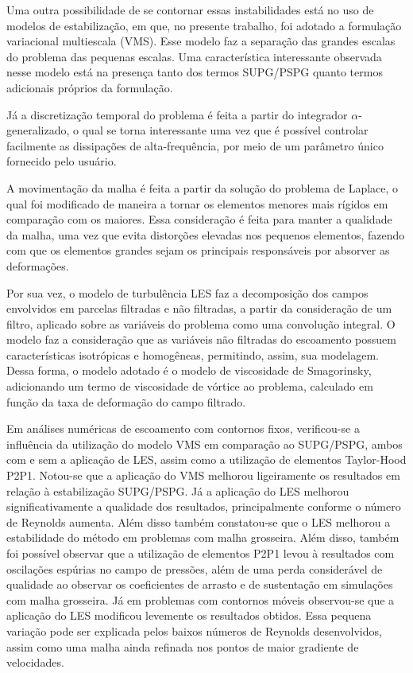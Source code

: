 Uma outra possibilidade de se contornar essas instabilidades está no uso de modelos de estabilização, em que, no presente trabalho, foi adotado a formulação variacional multiescala (VMS). Esse modelo faz a separação das grandes escalas do problema das pequenas escalas. Uma característica interessante observada nesse modelo está na presença tanto dos termos SUPG/PSPG quanto termos adicionais próprios da formulação.

Já a discretização temporal do problema é feita a partir do integrador $\alpha$-generalizado, o qual se torna interessante uma vez que é possível controlar facilmente as dissipações de alta-frequência, por meio de um parâmetro único fornecido pelo usuário.

A movimentação da malha é feita a partir da solução do problema de Laplace, o qual foi modificado de maneira a tornar os elementos menores mais rígidos em comparação com os maiores. Essa consideração é feita para manter a qualidade da malha, uma vez que evita distorções elevadas nos pequenos elementos, fazendo com que os elementos grandes sejam os principais responsáveis por absorver as deformações.

Por sua vez, o modelo de turbulência LES faz a decomposição dos campos envolvidos em parcelas filtradas e não filtradas, a partir da consideração de um filtro, aplicado sobre as variáveis do problema como uma convolução integral. O modelo faz a consideração que as variáveis não filtradas do escoamento possuem características isotrópicas e homogêneas, permitindo, assim, sua modelagem. Dessa forma, o modelo adotado é o modelo de viscosidade de Smagorinsky, adicionando um termo de viscosidade de vórtice ao problema, calculado em função da taxa de deformação do campo filtrado.

Em análises numéricas de escoamento com contornos fixos, verificou-se a influência da utilização do modelo VMS em comparação ao SUPG/PSPG, ambos com e sem a aplicação de LES, assim como a utilização de elementos Taylor-Hood P2P1. Notou-se que a aplicação do VMS melhorou ligeiramente os resultados em relação à estabilização SUPG/PSPG. Já a aplicação do LES melhorou significativamente a qualidade dos resultados, principalmente conforme o número de Reynolds aumenta. Além disso também constatou-se que o LES melhorou a estabilidade do método em problemas com malha grosseira. Além disso, também foi possível observar que a utilização de elementos P2P1 levou à resultados com oscilações espúrias no campo de pressões, além de uma perda considerável de qualidade ao observar os coeficientes de arrasto e de sustentação em simulações com malha grosseira. Já em problemas com contornos móveis observou-se que a aplicação do LES modificou levemente os resultados obtidos. Essa pequena variação pode ser explicada pelos baixos números de Reynolds desenvolvidos, assim como uma malha ainda refinada nos pontos de maior gradiente de velocidades.

